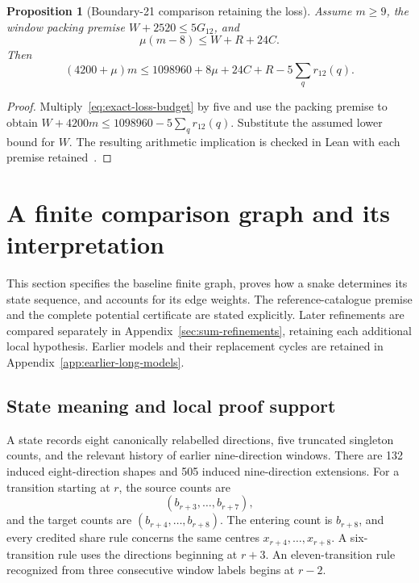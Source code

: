 \documentclass[11pt,a4paper]{article}
\newtheorem{proposition}[theorem]{Proposition}
\theoremstyle{definition}
\theoremstyle{remark}
\begin{document}
\begin{proposition}[Boundary-21 comparison retaining the loss]\label{prop:loss-potential}
Assume $m\ge9$, the window packing premise $W+2520\le5G_{12}$, and
\[
\mu(m-8)\le W+R+24C.
\]
Then
\begin{equation}\label{eq:retained-loss-potential}
(4200+\mu)m\le1098960+8\mu+24C+R-5\sum_qr_{12}(q).
\end{equation}
\end{proposition}
\begin{proof}
Multiply~\eqref{eq:exact-loss-budget} by five and use the packing premise
to obtain $W+4200m\le1098960-5\sum_qr_{12}(q)$.
Substitute the assumed lower bound for $W$. The resulting arithmetic
implication is checked in Lean with each premise retained~\cite{loss163archive}.
\end{proof}

\section{A finite comparison graph and its interpretation}\label{sec:current-model}
This section specifies the baseline finite graph, proves how a snake determines its state sequence, and accounts for its edge weights. The reference-catalogue premise and the complete potential certificate are stated explicitly. Later refinements are compared separately in Appendix~\ref{sec:sum-refinements}, retaining each additional local hypothesis. Earlier models and their replacement cycles are retained in Appendix~\ref{app:earlier-long-models}.

\subsection{State meaning and local proof support}
A state records eight canonically relabelled directions, five truncated singleton counts, and the relevant history of earlier nine-direction windows. There are 132 induced eight-direction shapes and 505 induced nine-direction extensions. For a transition starting at $r$, the source counts are
\[
(b_{r+3},\ldots,b_{r+7}),
\]
and the target counts are $(b_{r+4},\ldots,b_{r+8})$. The entering count is $b_{r+8}$, and every credited share rule concerns the same centres $x_{r+4},\ldots,x_{r+8}$. A six-transition rule uses the directions beginning at $r+3$. An eleven-transition rule recognized from three consecutive window labels begins at $r-2$.
\end{document}
